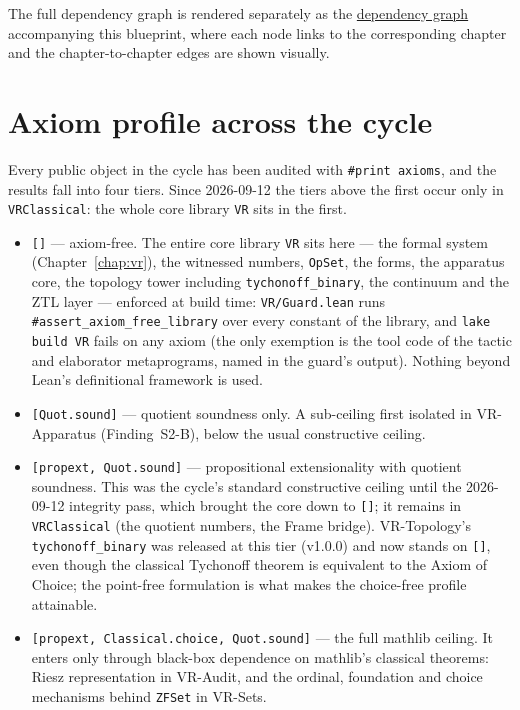 The full dependency graph is rendered separately as the
\href{dep_graph_document.html}{dependency graph} accompanying this
blueprint, where each node links to the corresponding chapter and the
chapter-to-chapter edges are shown visually.

\section{Axiom profile across the cycle}
\label{sec:overview_axioms}

Every public object in the cycle has been audited with \texttt{\#print
axioms}, and the results fall into four tiers.  Since 2026-09-12 the tiers
above the first occur only in \texttt{VRClassical}: the whole core library
\texttt{VR} sits in the first.

\begin{itemize}
\item \texttt{[]} --- axiom-free.  The entire core library \texttt{VR}
sits here --- the formal system (Chapter~\ref{chap:vr}), the witnessed
numbers, \texttt{OpSet}, the forms, the apparatus core, the topology tower
including \texttt{tychonoff\_binary}, the continuum and the ZTL layer ---
enforced at build time: \texttt{VR/Guard.lean} runs
\texttt{\#assert\_axiom\_free\_library} over every constant of the
library, and \texttt{lake build VR} fails on any axiom (the only exemption
is the tool code of the tactic and elaborator metaprograms, named in the
guard's output).  Nothing beyond Lean's definitional framework is used.

\item \texttt{[Quot.sound]} --- quotient soundness only.  A sub-ceiling
first isolated in VR-Apparatus (Finding~S2-B), below the usual
constructive ceiling.

\item \texttt{[propext, Quot.sound]} --- propositional extensionality with
quotient soundness.  This was the cycle's standard constructive ceiling
until the 2026-09-12 integrity pass, which brought the core down to
\texttt{[]}; it remains in \texttt{VRClassical} (the quotient numbers, the
Frame bridge).  VR-Topology's \texttt{tychonoff\_binary} was released at
this tier (v1.0.0) and now stands on \texttt{[]}, even though the classical
Tychonoff theorem is equivalent to the Axiom of Choice; the point-free
formulation is what makes the choice-free profile attainable.

\item \texttt{[propext, Classical.choice, Quot.sound]} --- the full mathlib
ceiling.  It enters only through black-box dependence on mathlib's
classical theorems: Riesz representation in VR-Audit, and the ordinal,
foundation and choice mechanisms behind \texttt{ZFSet} in VR-Sets.
\end{itemize}

